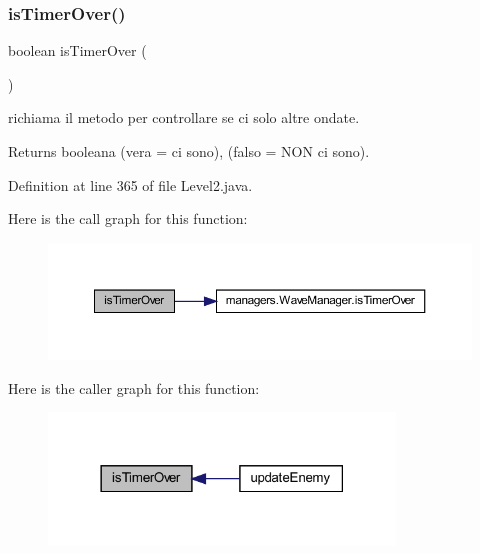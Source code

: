 \subsubsection{\texorpdfstring{is\+Timer\+Over()}{isTimerOver()}}
{\footnotesize\ttfamily boolean is\+Timer\+Over (\begin{DoxyParamCaption}{ }\end{DoxyParamCaption})\hspace{0.3cm}{\ttfamily [private]}}



richiama il metodo per controllare se ci solo altre ondate. 

\begin{DoxyReturn}{Returns}
booleana (vera = ci sono), (falso = N\+ON ci sono). 
\end{DoxyReturn}


Definition at line 365 of file Level2.\+java.

Here is the call graph for this function\+:
\nopagebreak
\begin{figure}[H]
\begin{center}
\leavevmode
\includegraphics[width=350pt]{classscenes_1_1_level2_ab68417e6738c05037923f5f0f21eb586_cgraph}
\end{center}
\end{figure}
Here is the caller graph for this function\+:\nopagebreak
\begin{figure}[H]
\begin{center}
\leavevmode
\includegraphics[width=261pt]{classscenes_1_1_level2_ab68417e6738c05037923f5f0f21eb586_icgraph}
\end{center}
\end{figure}
\mbox{\label{classscenes_1_1_level2_aa12eb1084be2c4d9b03d5f248f00900d}} 
